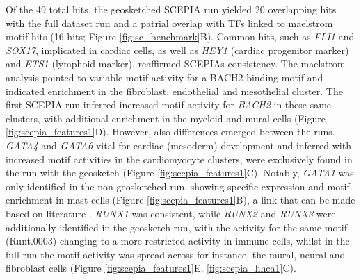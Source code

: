 Of the 49 total hits, the geosketched SCEPIA run yielded 20 overlapping hits with the full dataset run and a patrial overlap with TFs linked to maelstrom motif hits (16 hits; Figure \ref{fig:sc_benchmark}B). Common hits, such as \textit{FLI1} and \textit{SOX17}, implicated in cardiac cells, as well as \textit{HEY1} (cardiac progenitor marker) and \textit{ETS1} (lymphoid marker), reaffirmed SCEPIAs consistency. The maelstrom analysis pointed to variable motif activity for a BACH2-binding motif and indicated enrichment in the fibroblast, endothelial and mesothelial cluster. The first SCEPIA run inferred increased motif activity for \textit{BACH2} in these same clusters, with additional enrichment in the myeloid and mural cells (Figure \ref{fig:scepia_features1}D). However, also differences emerged between the runs. \textit{GATA4} and \textit{GATA6 }vital for cardiac (mesoderm) development and inferred with increased motif activities in the cardiomyocyte clusters, were exclusively found in the run with the geosketch (Figure \ref{fig:scepia_features1}C\cite{Morrisey1996,Song2022}). Notably, \textit{GATA1} was only identified in the non-geosketched run, showing specific expression and motif enrichment in mast cells (Figure \ref{fig:scepia_features1}B), a link that can be made based on literature  \cite{Migliaccio2003,Gao2015}. \textit{RUNX1} was consistent, while \textit{RUNX2} and \textit{RUNX3} were additionally identified in the geosketch run, with the activity for the same motif (Runt.0003) changing to a more restricted activity in immune cells, whilst in the full run the motif activity was spread across for instance, the mural, neural and fibroblast cells (Figure \ref{fig:scepia_features1}E, \ref{fig:scepia_hhca1}C).

